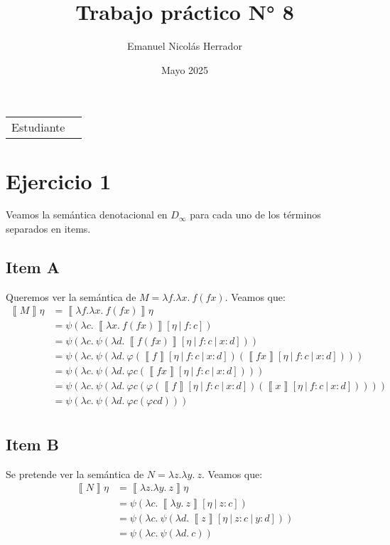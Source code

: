 \documentclass{article}
\title{Trabajo práctico N° 8}
\author{Emanuel Nicolás Herrador}
\date{Mayo 2025}
\newcommand{\sem}[1]{\left\llbracket #1\right\rrbracket}
\begin{document}
\maketitle

\noindent\begin{tabular}{@{}ll}
	Estudiante & \theauthor \\
\end{tabular}

\section*{Ejercicio 1}
Veamos la semántica denotacional en $D_\infty$ para cada uno de los términos separados en items.

\subsection*{Item A}
Queremos ver la semántica de $M = \lambda f.\lambda x.\ f(fx)$.
Veamos que:
\begin{equation*}
  \begin{aligned}
    \sem{M}\eta &= \sem{\lambda f.\lambda x.\ f(fx)}\eta \\ 
                &= \psi(\lambda c.\ \sem{\lambda x.\ f(fx)}[\eta\ |\ f : c]) \\ 
                &= \psi(\lambda c.\ \psi(\lambda d.\ \sem{f(fx)}[\eta\ |\ f : c\ |\ x : d])) \\ 
                &= \psi(\lambda c.\ \psi(\lambda d.\ \varphi(\sem{f}[\eta\ |\ f : c\ |\ x : d])(\sem{fx}[\eta\ |\ f : c\ |\ x : d]))) \\ 
                &= \psi(\lambda c.\ \psi(\lambda d.\ \varphi c (\sem{fx}[\eta\ |\ f : c\ |\ x : d]))) \\ 
                &= \psi(\lambda c.\ \psi(\lambda d.\ \varphi c (\varphi(\sem{f}[\eta\ |\ f : c\ |\ x : d])(\sem{x}[\eta\ |\ f : c\ |\ x : d])))) \\ 
                &= \psi(\lambda c.\ \psi(\lambda d.\ \varphi c (\varphi c d))) \\ 
  \end{aligned}
\end{equation*}

\subsection*{Item B}
Se pretende ver la semántica de $N = \lambda z.\lambda y.\ z$.
Veamos que:
\begin{equation*}
  \begin{aligned}
    \sem{N}\eta &= \sem{\lambda z.\lambda y.\ z}\eta \\ 
                &= \psi(\lambda c.\ \sem{\lambda y.\ z}[\eta\ |\ z : c]) \\ 
                &= \psi(\lambda c.\ \psi(\lambda d.\ \sem{z}[\eta\ |\ z : c\ |\ y : d])) \\ 
                &= \psi(\lambda c.\ \psi(\lambda d.\ c)) \\ 
  \end{aligned}
\end{equation*}
\end{document}
